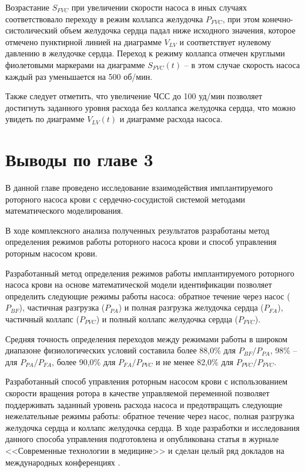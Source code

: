 Возрастание $S_{FVC}$ при увеличении скорости насоса в иных случаях соответствовало переходу в режим коллапса желудочка $P_{FVC}$, при этом конечно-систолический объем желудочка сердца падал ниже исходного значения, которое отмечено пунктирной линией на диаграмме $V_{LV}$ и соответствует нулевому давлению в желудочке сердца. Переход к режиму коллапса отмечен круглыми фиолетовыми маркерами на диаграмме $S_{FVC}(t)$ -- в этом случае скорость насоса каждый раз уменьшается на 500 об/мин.

Также следует отметить, что увеличение ЧСС до 100 уд/мин позволяет достигнуть заданного уровня расхода без коллапса желудочка сердца, что можно увидеть по диаграмме $V_{LV}(t)$ и диаграмме расхода насоса.

\section*{Выводы по главе 3} 

В данной главе проведено исследование взаимодействия имплантируемого роторного насоса крови с сердечно-сосудистой системой методами математического моделирования.

В ходе комплексного анализа полученных результатов разработаны метод определения режимов работы роторного насоса крови и способ управления роторным насосом крови.

Разработанный метод определения режимов работы имплантируемого роторного насоса крови на основе математической модели идентификации позволяет определить следующие режимы работы насоса: обратное течение через насос ($P_{BF}$), частичная разгрузка ($P_{PA}$) и полная разгрузка желудочка сердца ($P_{FA}$), частичный коллапс ($P_{PVC}$) и полный коллапс желудочка сердца ($P_{FVC}$).

Средняя точность определения переходов между режимами работы в широком диапазоне физиологических условий составила более 88,0\% для $P_{BF}/P_{PA}$,  98\% -- для $P_{PA}/P_{FA}$, более 90,0\% для $P_{FA}/P_{PVC}$ и не менее 82,0\% для $P_{PVC}/P_{FVC}$. 

Разработанный способ управления роторным насосом крови с использованием скорости вращения ротора в качестве управляемой переменной позволяет поддерживать заданный уровень расхода насоса и предотвращать следующие нежелательные режимы работы: обратное течение через насос, полная разгрузка желудочка сердца и коллапс желудочка сердца. В ходе разработки и исследования данного способа управления подготовлена и опубликована статья в журнале <<Современные технологии в медицине>> \cite{stm_2016} и сделан целый ряд докладов на международных конференциях \cite{asaio_2015, embc_2015_1, esao_2015, isrbp_2016, physbio_2017}.

